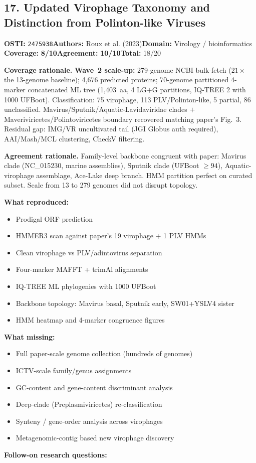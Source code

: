 \documentclass[11pt]{article}
\newcommand{\scorebadge}[2]{\textbf{#1:} \textbf{#2/10}}
\begin{document}
\subsection{17. Updated Virophage Taxonomy and Distinction from Polinton-like Viruses}
\textbf{OSTI:} \texttt{2475938}\quad\textbf{Authors:} Roux et al. (2023)\quad\textbf{Domain:} Virology / bioinformatics\\
\scorebadge{Coverage}{8}\quad\scorebadge{Agreement}{10}\quad\textbf{Total:} 18/20\par\smallskip
\noindent\textbf{Coverage rationale.} \textbf{Wave~2 scale-up:} 279-genome NCBI bulk-fetch ($21\times$ the 13-genome baseline); 4,676 predicted proteins; 70-genome partitioned 4-marker concatenated ML tree (1,403~aa, 4 LG$+$G partitions, IQ-TREE 2 with 1000 UFBoot). Classification: 75 virophage, 113 PLV/Polinton-like, 5 partial, 86 unclassified. Mavirus/Sputnik/Aquatic-Lavidaviridae clades $+$ Maveriviricetes/Polintoviricetes boundary recovered matching paper's Fig.~3. Residual gap: IMG/VR uncultivated tail (JGI Globus auth required), AAI/Mash/MCL clustering, CheckV filtering.\par
\noindent\textbf{Agreement rationale.} Family-level backbone congruent with paper: Mavirus clade (NC\_015230, marine assemblies), Sputnik clade (UFBoot $\geq 94$), Aquatic-virophage assemblage, Ace-Lake deep branch. HMM partition perfect on curated subset. Scale from 13 to 279 genomes did not disrupt topology.\par\smallskip
\noindent\textbf{What reproduced:}
\begin{itemize}[leftmargin=1.4em,itemsep=0.2em,topsep=0.2em]
\item Prodigal ORF prediction
\item HMMER3 scan against paper's 19 virophage + 1 PLV HMMs
\item Clean virophage vs PLV/adintovirus separation
\item Four-marker MAFFT + trimAl alignments
\item IQ-TREE ML phylogenies with 1000 UFBoot
\item Backbone topology: Mavirus basal, Sputnik early, SW01+YSLV4 sister
\item HMM heatmap and 4-marker congruence figures
\end{itemize}\noindent\textbf{What missing:}
\begin{itemize}[leftmargin=1.4em,itemsep=0.2em,topsep=0.2em]
\item Full paper-scale genome collection (hundreds of genomes)
\item ICTV-scale family/genus assignments
\item GC-content and gene-content discriminant analysis
\item Deep-clade (Preplasmiviricetes) re-classification
\item Synteny / gene-order analysis across virophages
\item Metagenomic-contig based new virophage discovery
\end{itemize}\noindent\textbf{Follow-on research questions:}
\end{document}
